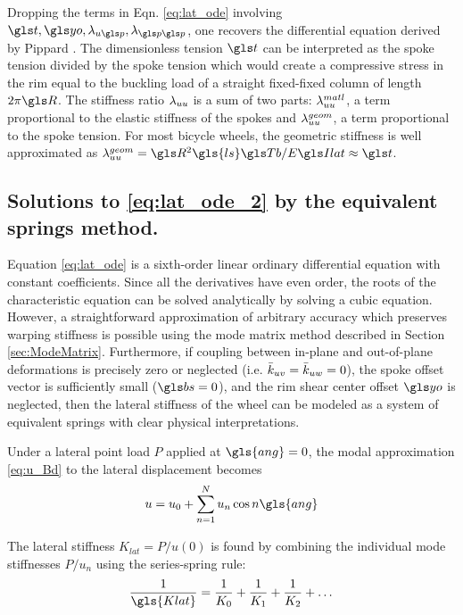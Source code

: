 \documentclass[\rootdir/thesis.tex]{subfiles}
\begin{document}
Dropping the terms in Eqn. \eqref{eq:lat_ode} involving $\ts, \yo, \lr_{u\p}, \lr_{\p\p}$, one recovers the differential equation derived by Pippard \cite{Pippard1932a}. The dimensionless tension $\ts$ can be interpreted as the spoke tension divided by the spoke tension which would create a compressive stress in the rim equal to the buckling load of a straight fixed-fixed column of length $2\pi \R$. The stiffness ratio $\lambda_{uu}$ is a sum of two parts: $\lambda_{uu}^{matl}$, a term proportional to the elastic stiffness of the spokes and $\lambda_{uu}^{geom}$, a term proportional to the spoke tension. For most bicycle wheels, the geometric stiffness is well approximated as $\geom{\lr_{uu}} = \R^2\gls{ls}\Tb/\EIl \approx \ts$.

\subsection{Solutions to \eqref{eq:lat_ode_2} by the equivalent springs method.}
\label{sec:equiv_springs}

Equation \eqref{eq:lat_ode} is a sixth-order linear ordinary differential equation with constant coefficients. Since all the derivatives have even order, the roots of the characteristic equation can be solved analytically by solving a cubic equation. However, a straightforward approximation of arbitrary accuracy which preserves warping stiffness is possible using the mode matrix method described in Section \ref{sec:ModeMatrix}. Furthermore, if coupling between in-plane and out-of-plane deformations is precisely zero or neglected (i.e. $\bar{k}_{uv} = \bar{k}_{uw} = 0$), the spoke offset vector is sufficiently small ($\bs=0$), and the rim shear center offset $\yo$ is neglected, then the lateral stiffness of the wheel can be modeled as a system of equivalent springs with clear physical interpretations.

Under a lateral point load $P$ applied at $\gls{ang}=0$, the modal approximation \eqref{eq:u_Bd} to the lateral displacement becomes
\begin{equation}
\label{eq:u_kequiv}
u = u_0 + \sum_{n=1}^N u_n \cos{n\gls{ang}}
\end{equation}

The lateral stiffness $K_{lat}=P/u(0)$ is found by combining the individual mode stiffnesses $P/u_n$ using the series-spring rule:
\begin{equation}
\label{eq:Klat_series}
\frac{1}{\gls{Klat}} = \frac{1}{K_0} + \frac{1}{K_1} + \frac{1}{K_2} + \dots
\end{equation}
\end{document}
